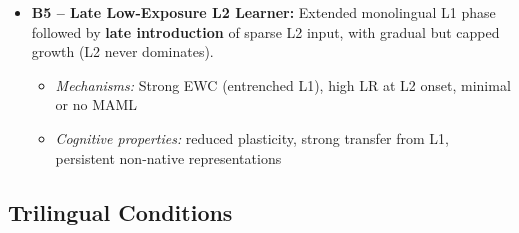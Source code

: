\begin{itemize}
    \item \textbf{B5 – Late Low-Exposure L2 Learner:} Extended monolingual L1 phase followed by \textbf{late introduction} of sparse L2 input, with gradual but capped growth (L2 never dominates).
    \begin{itemize}
        \item \textit{Mechanisms:} Strong EWC (entrenched L1), high LR at L2 onset, minimal or no MAML
        \item \textit{Cognitive properties:} reduced plasticity, strong transfer from L1, persistent non-native representations
    \end{itemize}
\end{itemize}

\subsection{Trilingual Conditions}


